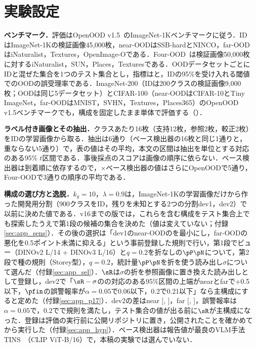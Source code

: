 

\section{実験設定}
\label{sec:exp}
\textbf{ベンチマーク．}評価はOpenOOD v1.5~\cite{zhang2023openood}のImageNet-1Kベンチマークに従う．IDはImageNet-1Kの検証画像45,000枚，near-OODはSSB-hardとNINCO，far-OODはiNaturalist，Textures，OpenImage-Oである．Four-OOD~\cite{huang2021mos}は検証画像50,000枚に対するiNaturalist，SUN，Places，Texturesである．OODデータセットごとにIDと混ぜた集合を1つのテスト集合とし，指標は\AUC{}と，IDの95\%を受け入れる閾値でのOODの誤受理率\FPR{}である．ImageNet-200（IDは200クラスの検証画像9,000枚；OODは同じ5データセット）とCIFAR-100（near-OODはCIFAR-10とTiny ImageNet，far-OODはMNIST，SVHN，Textures，Places365）のOpenOOD v1.5ベンチマークでも，構成を固定したまま単体で評価する（）．

\textbf{ラベル付き画像とその抽出．}クラスあたり16枚（支持12枚，参照2枚，較正2枚）をIDの学習画像から取る．抽出は6通り（ベース検出器の16枚と同じ1通りと，重ならない5通り）で，表の値はその平均，本文の区間は抽出を単位とする対応のある95\% $t$区間である．事後採点のスコアは画像の順序に依らない．ベース検出器は到着順に依存するので，$\times$ベース検出器の値はさらにOpenOODで5通り，Four-OODで3通りの順序の平均である．

\textbf{構成の選び方と逸脱．}$k_g{=}10$，$\lambda{=}0.9$は，ImageNet-1Kの学習画像だけから作った開発用分割（900クラスをID，残りを未知とする2つの分割dev1，dev2）で以前に決めた値である．v16までの版では，これらを含む構成をテスト集合上でも探索したうえで第1段の候補の集合を決めた（値は変えていない；付録\ref{sec:app_sens}）．その後の選択は「dev1のnear-OODの\FPR{}を最小にし，far-OODの悪化を0.5ポイント未満に抑える」という事前登録した規則で行い，第1段でビュー（DINOv2 L/14 + DINOv3 L/16）と$q{=}0.2$を折なしの$\pP\pN$について，第2段で種の規則（Storey型），$q{=}0.2$，統計量$\pP\pN$を折を使う読み出し$\sigma$について選んだ（付録\ref{sec:app_sel}）．$\sR$は$\sigma$の折を参照画像に置き換えた読み出しとして登録し，dev2で「$\sR-\sigma$の\FPR{}の対応のある95\%区間の上端がnearとfarで+0.5以下，$\pfin$の誤警報率が$\alpha{=}0.05$で0.06以下，$0.2$で0.21以下」なら主構成にすると定めた（付録\ref{sec:app_p17}）．dev2の差はnear \NRDevTwoNearD{} [\NRDevTwoNearDLo, \NRDevTwoNearDHi]，far \NRDevTwoFarD{} [\NRDevTwoFarDLo, \NRDevTwoFarDHi]，誤警報率は$\alpha{=}0.05$で\NRDevTwoFprFive{}，$0.2$で\NRDevTwoFprTwenty{}で規則を満たし，テスト集合の値が出る前に$\sR$が主構成になった．登録は評価の実行前に公開リポジトリに置き，公開されたことを確かめてから実行した（付録\ref{sec:app_hyp}）．ベース検出器は報告値が最良のVLM手法TINS~\cite{yang2026tins}（CLIP ViT-B/16）で，本稿の実験では選んでいない．

